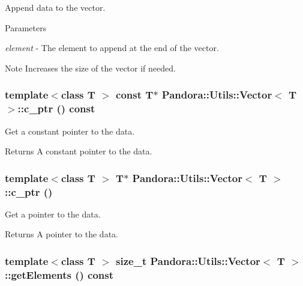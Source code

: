 Append data to the vector. 
\begin{DoxyParams}{Parameters}
\item[{\em element}]-\/ The element to append at the end of the vector. \end{DoxyParams}
\begin{DoxyNote}{Note}
Increases the size of the vector if needed. 
\end{DoxyNote}
\hypertarget{classPandora_1_1Utils_1_1Vector_ac3306d38479a1ae6e28eadd9f346f8fa}{
\subsubsection[{c\_\-ptr}]{\setlength{\rightskip}{0pt plus 5cm}template$<$class T $>$ const T$\ast$ {\bf Pandora::Utils::Vector}$<$ T $>$::c\_\-ptr () const}}
\label{classPandora_1_1Utils_1_1Vector_ac3306d38479a1ae6e28eadd9f346f8fa}


Get a constant pointer to the data. \begin{DoxyReturn}{Returns}
A constant pointer to the data. 
\end{DoxyReturn}
\hypertarget{classPandora_1_1Utils_1_1Vector_a6392a54fb8c8e1dc9e6f1128f7b8cb03}{
\subsubsection[{c\_\-ptr}]{\setlength{\rightskip}{0pt plus 5cm}template$<$class T $>$ T$\ast$ {\bf Pandora::Utils::Vector}$<$ T $>$::c\_\-ptr ()}}
\label{classPandora_1_1Utils_1_1Vector_a6392a54fb8c8e1dc9e6f1128f7b8cb03}


Get a pointer to the data. \begin{DoxyReturn}{Returns}
A pointer to the data. 
\end{DoxyReturn}
\hypertarget{classPandora_1_1Utils_1_1Vector_a4d21fd9aff673df56471a9724b36fe2c}{
\subsubsection[{getElements}]{\setlength{\rightskip}{0pt plus 5cm}template$<$class T $>$ size\_\-t {\bf Pandora::Utils::Vector}$<$ T $>$::getElements () const}}
\label{classPandora_1_1Utils_1_1Vector_a4d21fd9aff673df56471a9724b36fe2c}


